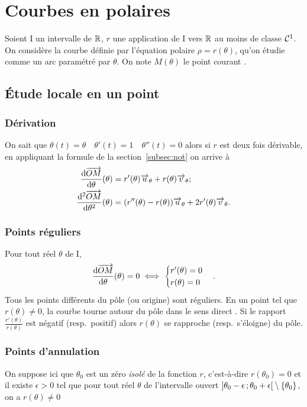 \section{Courbes en polaires}
Soient I un intervalle de \(\mathbb{R}\), \(r\) une application de I vers \(\mathbb{R}\) au moins de classe \(\mathcal{C}^{1}\). On considère la courbe définie par l'équation polaire \(\rho=r(\theta)\), qu'on étudie comme un arc paramétré par \(\theta\). On note \(M(\theta)\) le point \og courant \fg{}.

\subsection{Étude locale en un point}
\subsubsection{Dérivation}
On sait que \(\theta(t)=\theta \quad \theta'(t)=1 \quad \theta''(t)=0\) alors si \(r\) est deux fois dérivable, en appliquant la formule de la section~\ref{subsec:not} on arrive à
\begin{align}
 \dfrac{\mathrm{d} \overrightarrow{OM}}{\mathrm{d} \theta}(\theta)&=r'(\theta) \overrightarrow{u}_\theta + r(\theta) \overrightarrow{v}_\theta;\\
 \dfrac{\mathrm{d}^2 \overrightarrow{OM}}{\mathrm{d} {\theta}^2}(\theta)&=(r''(\theta)-r(\theta)) \overrightarrow{u}_\theta + 2r'(\theta) \overrightarrow{v}_\theta.
\end{align}

\subsubsection{Points réguliers}
Pour tout réel \(\theta\) de I,
\begin{equation}
 \dfrac{\mathrm{d} \overrightarrow{OM}}{\mathrm{d} \theta}(\theta)=0 \iff
 \begin{cases}
   r'(\theta) = 0 \\ r(\theta)=0
 \end{cases}.
\end{equation}
Tous les points différents du pôle (ou origine) sont réguliers. En un point tel que \(r(\theta) \neq 0\), la courbe \og tourne autour du pôle dans le sens direct \fg{}. Si le rapport \(\frac{r'(\theta)}{r(\theta)}\) est négatif (resp.\ positif) alors \(r(\theta)\) se rapproche (resp.\ s'éloigne) du pôle.

\subsubsection{Points d'annulation}
On suppose ici que \(\theta_0\) est un zéro \emph{isolé} de la fonction \(r\), c'est-à-dire \(r(\theta_0)=0\) et il existe \(\epsilon >0\) tel que pour tout réel \(\theta\) de l'intervalle ouvert \(\left] \theta_0-\epsilon \, ;  \theta_0+\epsilon \right[\setminus\{\theta_0\}\), on a \(r(\theta) \neq 0\)

